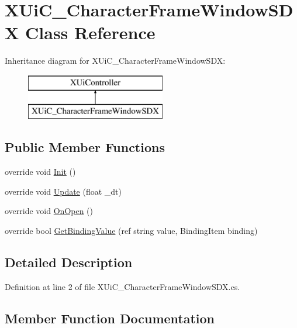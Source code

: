 \hypertarget{class_x_ui_c___character_frame_window_s_d_x}{}\section{X\+Ui\+C\+\_\+\+Character\+Frame\+Window\+S\+DX Class Reference}
\label{class_x_ui_c___character_frame_window_s_d_x}
Inheritance diagram for X\+Ui\+C\+\_\+\+Character\+Frame\+Window\+S\+DX\+:\begin{figure}[H]
\begin{center}
\leavevmode
\includegraphics[height=2.000000cm]{d2/dc0/class_x_ui_c___character_frame_window_s_d_x}
\end{center}
\end{figure}
\subsection*{Public Member Functions}
\begin{DoxyCompactItemize}
\item 
override void \mbox{\hyperlink{class_x_ui_c___character_frame_window_s_d_x_a5adbffd6a1624cc71b92fa1430fbd325}{Init}} ()
\item 
override void \mbox{\hyperlink{class_x_ui_c___character_frame_window_s_d_x_a7bda15f5e5dca51a1f426a2893ca6a6d}{Update}} (float \+\_\+dt)
\item 
override void \mbox{\hyperlink{class_x_ui_c___character_frame_window_s_d_x_ade8c88125fd81efcf5f2cd2441bec993}{On\+Open}} ()
\item 
override bool \mbox{\hyperlink{class_x_ui_c___character_frame_window_s_d_x_a41cbb997886b20c30c32d773af272789}{Get\+Binding\+Value}} (ref string value, Binding\+Item binding)
\end{DoxyCompactItemize}


\subsection{Detailed Description}


Definition at line 2 of file X\+Ui\+C\+\_\+\+Character\+Frame\+Window\+S\+D\+X.\+cs.



\subsection{Member Function Documentation}
\mbox{\label{class_x_ui_c___character_frame_window_s_d_x_a41cbb997886b20c30c32d773af272789}} 
